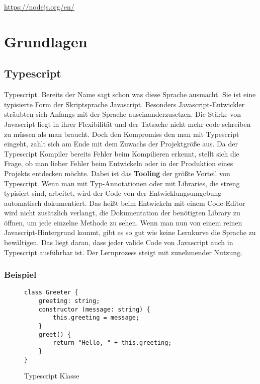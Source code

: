 \begin{center}
\url{https://nodejs.org/en/}
\end{center}

\section{Grundlagen}

\subsection{Typescript}
Typescript. Bereits der Name sagt schon was diese Sprache ausmacht. Sie ist eine typisierte Form der Skriptsprache Javascript. Besonders Javascript-Entwickler sträubten sich Anfangs mit der Sprache auseinanderzusetzen. Die Stärke von Javascript liegt in ihrer Flexibilität und der Tatsache nicht mehr code schreiben zu müssen als man braucht. Doch den Kompromiss den man mit Typescript eingeht, zahlt sich am Ende mit dem Zuwachs der Projektgröße aus. Da der Typescript Kompiler bereits Fehler beim Kompilieren erkennt, stellt sich die Frage, ob man lieber Fehler beim Entwickeln oder in der Produktion eines Projekts entdecken möchte. Dabei ist das \textbf{Tooling} der größte Vorteil von Typescript. Wenn man mit Typ-Annotationen oder mit Libraries, die streng typisiert sind, arbeitet, wird der Code von der Entwicklungsumgebung automatisch dokumentiert. Das heißt beim Entwickeln mit einem Code-Editor wird nicht zusätzlich verlangt, die Dokumentation der benötigten Library zu öffnen, um jede einzelne Methode zu sehen. Wenn man nun von einem reinen Javascript-Hintergrund kommt, gibt es so gut wie keine Lernkurve die Sprache zu bewältigen. Das liegt daran, dass jeder valide Code von Javascript auch in Typescript ausführbar ist. Der Lernprozess steigt mit zunehmender Nutzung.

\subsubsection{Beispiel}

\begin{figure}[H]
\begin{lstlisting}[basicstyle=\small]
class Greeter {
    greeting: string;
    constructor (message: string) {
        this.greeting = message;
    }
    greet() {
        return "Hello, " + this.greeting;
    }
}  
\end{lstlisting}
\caption{Typescript Klasse \cite{typescript-example}}
\end{figure}

